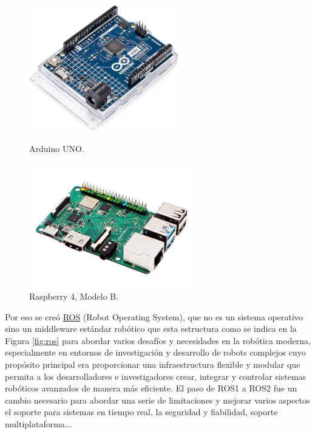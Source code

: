 \begin{figure}[h!]
  \begin{minipage}{0.48\textwidth}
    \centering
    \includegraphics[width=6.5cm]{figs/arduino_uno.jpg}
    \caption{Arduino UNO.}
    \label{fig:arduino}
  \end{minipage}
  \hfill
  \begin{minipage}{0.48\textwidth}
    \centering
    \includegraphics[width=7.2cm]{figs/raspberry4.png}
    \caption{Raspberry 4, Modelo B.} 
    \label{fig:raspberry}
  \end{minipage}
\end{figure}

Por eso se creó \hyperlink{ROS}{ROS} (Robot Operating System), que no es un sistema operativo sino un middleware estándar robótico que esta estructura como se indica en la Figura \ref{fig:ros} para abordar varios desafíos y necesidades en la robótica moderna, especialmente en entornos de investigación y desarrollo de robots complejos cuyo propósito principal era proporcionar una infraestructura flexible y modular que permita a los desarrolladores e investigadores crear, integrar y controlar sistemas robóticos avanzados de manera más eficiente. El paso de ROS1 a ROS2 fue un cambio necesario para abordar una serie de limitaciones y mejorar varios aspectos el soporte para sistemas en tiempo real, la seguridad y fiabilidad, soporte multiplataforma...


